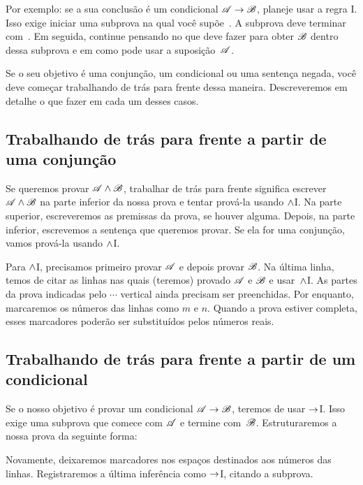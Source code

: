 Por exemplo: se a sua conclusão é um condicional $\mathscr{A}\rightarrow\mathscr{B}$, planeje usar a regra {\eif}I. Isso exige iniciar uma subprova na qual você supõe~. A subprova deve terminar com~. Em seguida, continue pensando no que deve fazer para obter $\mathscr{B}$ dentro dessa subprova e em como pode usar a suposição~$\mathscr{A}$.

Se o seu objetivo é uma conjunção, um condicional ou uma sentença negada, você deve começar trabalhando de trás para frente dessa maneira. Descreveremos em detalhe o que fazer em cada um desses casos.

\subsection*{Trabalhando de trás para frente a partir de uma conjunção}

Se queremos provar $\mathscr{A} \wedge \mathscr{B}$, trabalhar de trás para frente significa escrever $\mathscr{A} \wedge \mathscr{B}$ na parte inferior da nossa prova e tentar prová-la usando $\wedge$I. Na parte superior, escreveremos as premissas da prova, se houver alguma. Depois, na parte inferior, escrevemos a sentença que queremos provar. Se ela for uma conjunção, vamos prová-la usando $\wedge$I.
  \begin{fitchproof}
	\PR
	\ellipsesline 
	\PR
\ellipsesline
    \ellipsesline 
  \end{fitchproof}
Para $\wedge$I, precisamos primeiro provar $\mathscr{A}$ e depois provar
$\mathscr{B}$. Na última linha, temos de citar as linhas nas quais
(teremos) provado $\mathscr{A}$ e $\mathscr{B}$ e usar~$\wedge$I. As
partes da prova indicadas pelo $\cdots$ vertical ainda precisam ser preenchidas.
Por enquanto, marcaremos os números das linhas como $m$ e $n$. Quando a prova estiver
completa, esses marcadores poderão ser substituídos pelos números reais.

\subsection*{Trabalhando de trás para frente a partir de um condicional}

Se o nosso objetivo é provar um condicional $\mathscr{A} \rightarrow \mathscr{B}$, teremos de usar $\rightarrow$I. Isso exige uma subprova que comece com $\mathscr{A}$ e termine com~$\mathscr{B}$. Estruturaremos a nossa prova da seguinte forma:
\begin{fitchproof}
\open
{}
\ellipsesline 
{}
\close
{}
\end{fitchproof} 
Novamente, deixaremos marcadores nos espaços destinados aos números das linhas. Registraremos a última inferência como $\rightarrow$I, citando a subprova.

